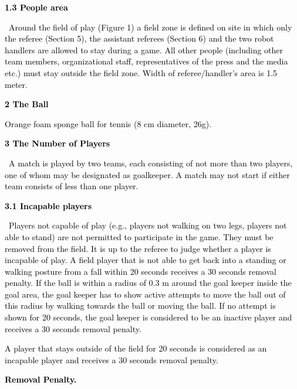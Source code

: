 \documentclass[a4paper]{article}
\begin{document}
\textbf{\textcolor{black}{1.3 People area}}

\textcolor{black}{\ Around the field of play (Figure 1) a field zone is defined on site in which only the referee
(Section 5), the assistant referees (Section 6) and the two robot handlers are allowed to stay during a game. All other
people (including other team members, organizational staff, representatives of the press and the media etc.) must stay
outside the field zone. Width of referee/handler's area is 1.5 meter.}

\bigskip

\textbf{\textcolor{black}{2 The Ball}}

\textcolor{black}{Orange foam sponge ball for tennis (8 cm diameter, 26g).}

\bigskip

\textbf{\textcolor{black}{3 The Number of Players}}

\textcolor{black}{\ A match is played by two teams, each consisting of not more than two players, one of whom may be
designated as goalkeeper. A match may not start if either team consists of less than one player.}


\bigskip

\textbf{\textcolor{black}{3.1 Incapable players}}

\textcolor{black}{\ Players not capable of play (e.g., players not walking on two legs, players not able to stand) are
not permitted to participate in the game. They must be removed from the field. It is up to the referee to judge whether
a player is incapable of play. A field player that is not able to get back into a standing or walking posture from a
fall within 20 seconds receives a 30 seconds removal penalty. If the ball is within a radius of 0.3 m around the goal
keeper inside the goal area, the goal keeper has to show active attempts to move the ball out of this radius by walking
towards the ball or moving the ball. If no attempt is shown for 20 seconds, the goal keeper is considered to be an
inactive player and receives a 30 seconds removal penalty.}

\textcolor{black}{A player that stays outside of the field for 20 seconds is considered as an incapable player and
receives a 30 seconds removal penalty.}


\bigskip

\textbf{\textcolor{black}{Removal Penalty.}}
\end{document}
